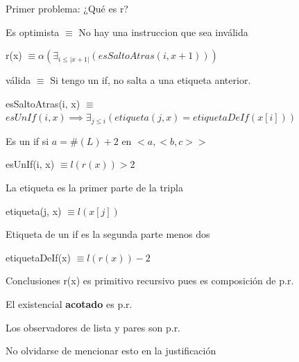 \documentclass{beamer}
\begin{document}
\begin{frame}
	Primer problema: ¿Qué es r?
	
	\bigskip
	\pause

	\hfill Es optimista $\equiv$ No hay una instruccion que sea inválida 

	\medskip
	\pause


	r(x) $\equiv \alpha(\exists_{i \leq |x+1|}(esSaltoAtras(i, x+1))) $

	\bigskip
	\pause


	\hfill válida $\equiv$ Si tengo un if, no salta a una etiqueta anterior. 

	\medskip
	\pause


	esSaltoAtras(i, x) $ \equiv$ \\
	$esUnIf(i, x) \implies \exists_{j \leq i}(etiqueta(j, x) = etiquetaDeIf(x[i]) ) $

	\bigskip

	
\end{frame}
\begin{frame}
	
	\hfill Es un if si $a = \#(L) + 2$ en $<a, <b, c> >$ 

	\medskip
	\pause

	esUnIf(i, x) $ \equiv l(r(x)) > 2$

	\bigskip
	\pause

	\hfill La etiqueta es la primer parte de la tripla

	\medskip
	\pause

	etiqueta(j, x) $ \equiv l(x[j])$

	\bigskip
	\pause

	\hfill Etiqueta de un if es la segunda parte menos dos

	\medskip
	\pause

	etiquetaDeIf(x) $ \equiv l(r(x)) - 2$
\end{frame}

\begin{frame}{Conclusiones}
	r(x) es primitivo recursivo pues es composición de p.r.

	\bigskip

	El existencial \textbf{acotado} es p.r.

	\bigskip

	Los observadores de lista y pares son p.r.

	\bigskip
	\bigskip
	\bigskip

	No olvidarse de mencionar esto en la justificación

\end{frame}
\end{document}
